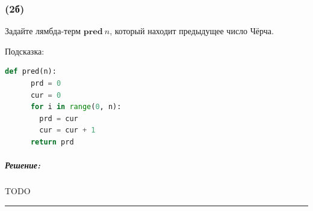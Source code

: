 \documentclass{article}
\newenvironment{proof}{\subparagraph{\hspace{-1em}Решение:\newline}}{\par\noindent\rule{\textwidth}{0.4pt}}
\newcommand{\term}[1]{\mathbf{#1}}
\begin{document}
    \subsubsection{(2б)}

    Задайте лямбда-терм $\term{pred}~n$, который находит предыдущее число Чёрча.

    Подсказка:
    \begin{lstlisting}[language=Python]
    def pred(n):
      prd = 0
      cur = 0
      for i in range(0, n):
        prd = cur
        cur = cur + 1
      return prd
    \end{lstlisting}

    \begin{proof}
        TODO %
    \end{proof}
\end{document}
